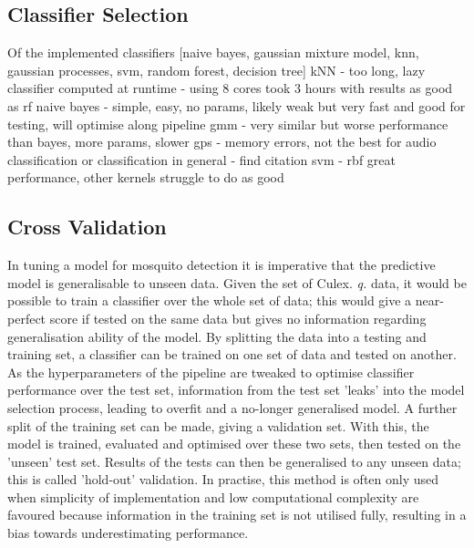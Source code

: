       
     
    \subsection{Classifier Selection}
    \label{subsec:exp-clf-select}
        Of the implemented classifiers [naive bayes, gaussian mixture model, knn, gaussian processes, svm, random forest, decision tree]
        kNN - too long, lazy classifier computed at runtime - using 8 cores took 3 hours with results as good as rf
        naive bayes - simple, easy, no params, likely weak but very fast and good for testing, will optimise along pipeline
        gmm - very similar but worse performance than bayes, more params, slower %
        gps - memory errors, not the best for audio classification or classification in general - find citation
        svm - rbf great performance, other kernels struggle to do as good
       
    \subsection{Cross Validation}
    \label{subsec:exp-clf-xval}
        In tuning a model for mosquito detection it is imperative that the predictive model is generalisable to unseen data. Given the set of Culex. \textit{q.} data, it would be possible to train a classifier over the whole set of data; this would give a near-perfect score if tested on the same data but gives no information regarding generalisation ability of the model. By splitting the data into a testing and training set, a classifier can be trained on one set of data and tested on another. As the hyperparameters of the pipeline are tweaked to optimise classifier performance over the test set, information from the test set 'leaks' into the model selection process, leading to overfit and a no-longer generalised model. A further split of the training set can be made, giving a validation set. With this, the model is trained, evaluated and optimised over these two sets, then tested on the 'unseen' test set. Results of the tests can then be generalised to any unseen data; this is called 'hold-out' validation. In practise, this method is often only used when simplicity of implementation and low computational complexity are favoured because information in the training set is not utilised fully, resulting in a bias towards underestimating performance.
     
